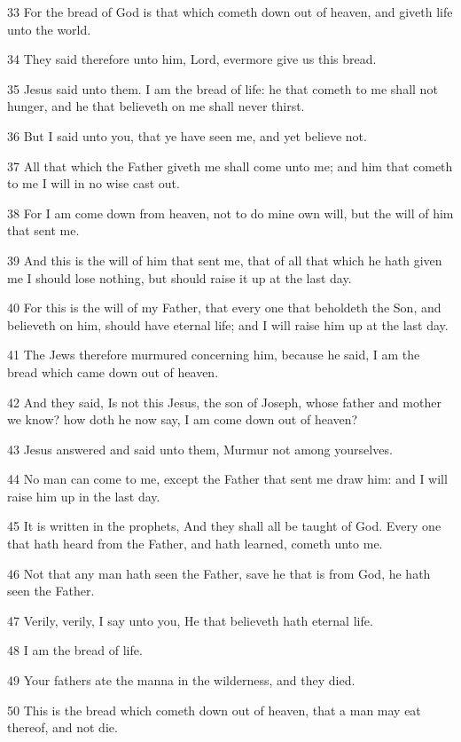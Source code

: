 \par 33 For the bread of God is that which cometh down out of heaven, and giveth life unto the world.
\par 34 They said therefore unto him, Lord, evermore give us this bread.
\par 35 Jesus said unto them. I am the bread of life: he that cometh to me shall not hunger, and he that believeth on me shall never thirst.
\par 36 But I said unto you, that ye have seen me, and yet believe not.
\par 37 All that which the Father giveth me shall come unto me; and him that cometh to me I will in no wise cast out.
\par 38 For I am come down from heaven, not to do mine own will, but the will of him that sent me.
\par 39 And this is the will of him that sent me, that of all that which he hath given me I should lose nothing, but should raise it up at the last day.
\par 40 For this is the will of my Father, that every one that beholdeth the Son, and believeth on him, should have eternal life; and I will raise him up at the last day.
\par 41 The Jews therefore murmured concerning him, because he said, I am the bread which came down out of heaven.
\par 42 And they said, Is not this Jesus, the son of Joseph, whose father and mother we know? how doth he now say, I am come down out of heaven?
\par 43 Jesus answered and said unto them, Murmur not among yourselves.
\par 44 No man can come to me, except the Father that sent me draw him: and I will raise him up in the last day.
\par 45 It is written in the prophets, And they shall all be taught of God. Every one that hath heard from the Father, and hath learned, cometh unto me.
\par 46 Not that any man hath seen the Father, save he that is from God, he hath seen the Father.
\par 47 Verily, verily, I say unto you, He that believeth hath eternal life.
\par 48 I am the bread of life.
\par 49 Your fathers ate the manna in the wilderness, and they died.
\par 50 This is the bread which cometh down out of heaven, that a man may eat thereof, and not die.
